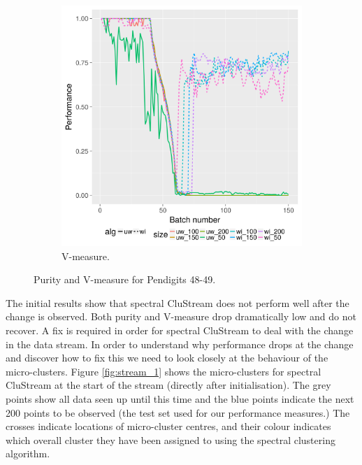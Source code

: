 \begin{figure}[!h]
\begin{subfigure}[b]{0.47\textwidth}
          \includegraphics[width=\textwidth]{standard_alt/evolving_pen_48_49_standard_vmeasure.png}
                 \caption{V-measure.}
                 \label{fig:v_4849}
        \end{subfigure}
\caption{Purity and V-measure for  Pendigits 48-49.}
\label{fig:results_48-49}
\end{figure}

The initial results show that spectral CluStream does not perform well after the change is observed. Both purity and V-measure drop dramatically low and do not recover. A fix is required in order for spectral CluStream to deal with the change in the data stream. In order to understand why performance drops at the change and discover how to fix this we need to look closely at the behaviour of the  micro-clusters. Figure \ref{fig:stream_1} shows the micro-clusters for spectral CluStream at the start of the stream (directly after initialisation). The grey points show all data seen up until this time and the blue points indicate the next 200 points to be observed (the test set used for our performance measures.) The crosses indicate locations of micro-cluster centres, and their colour indicates which overall cluster they have been assigned to using the spectral clustering algorithm. 

